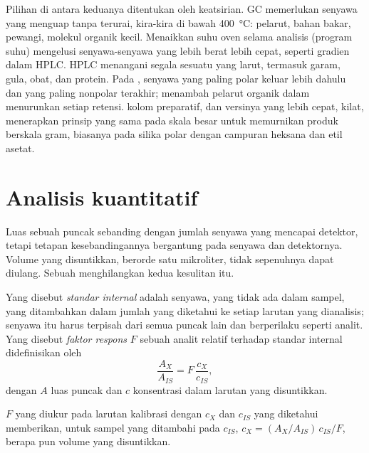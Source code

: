 Pilihan di antara keduanya ditentukan oleh keatsirian. GC memerlukan
senyawa yang menguap tanpa terurai, kira-kira di bawah
\qty{400}{\degreeCelsius}: pelarut, bahan bakar, pewangi, molekul organik
kecil. Menaikkan suhu oven selama analisis (program suhu) mengelusi
senyawa-senyawa yang lebih berat lebih cepat, seperti gradien dalam HPLC.
HPLC menangani segala sesuatu yang larut, termasuk garam, gula, obat, dan
protein. Pada , senyawa yang paling polar keluar lebih dahulu
dan yang paling nonpolar terakhir; menambah pelarut organik dalam  menurunkan setiap retensi.  kolom preparatif, dan versinya
yang lebih cepat,  kilat, menerapkan prinsip yang sama pada
skala besar untuk memurnikan produk berskala gram, biasanya pada silika
polar dengan campuran heksana dan etil asetat.

\section{Analisis kuantitatif}

Luas sebuah puncak sebanding dengan jumlah senyawa yang mencapai detektor,
tetapi tetapan kesebandingannya bergantung pada senyawa dan detektornya.
Volume yang disuntikkan, berorde satu mikroliter, tidak sepenuhnya dapat
diulang. Sebuah  menghilangkan kedua kesulitan itu.

\begin{definition}\label{def:b2:chromatography:quantitative}
Yang disebut \emph{standar internal} adalah senyawa,
yang tidak ada dalam sampel, yang ditambahkan dalam jumlah yang diketahui
ke setiap larutan yang dianalisis; senyawa itu harus terpisah dari semua
puncak lain dan berperilaku seperti analit. Yang disebut \emph{faktor
respons} $F$ sebuah analit relatif terhadap standar
internal didefinisikan oleh
\begin{equation*}
\frac{A_X}{A_{IS}} = F\,\frac{c_X}{c_{IS}},
\end{equation*}
dengan $A$ luas puncak dan $c$ konsentrasi dalam larutan yang disuntikkan.
\end{definition}

\begin{proposition}\label{prop:b2:chromatography:internal-standard}
$F$ yang diukur pada larutan kalibrasi dengan $c_X$ dan $c_{IS}$ yang
diketahui memberikan, untuk sampel yang ditambahi  pada
$c_{IS}$, $c_X = (A_X/A_{IS})\,c_{IS}/F$, berapa pun volume yang disuntikkan.
\end{proposition}

